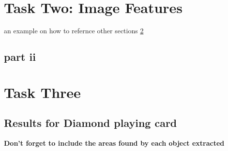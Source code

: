 \documentclass[conference]{IEEEtran}
\begin{document}
\section{Task Two: Image Features} \label{two}
an example on how to refernce other sections \ref{three}

\subsection{part ii} \label{two ii}

\section{Task Three} \label{three}
\subsection{Results for Diamond playing card}

\textbf{Don't forget to include the areas found by each object extracted}
\end{document}
